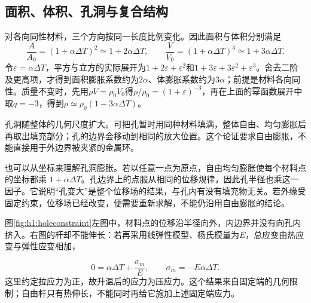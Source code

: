 \subsection{面积、体积、孔洞与复合结构}
对各向同性材料，三个方向按同一长度比例变化。因此面积与体积分别满足
\[\frac A{A_0}=(1+\alpha\Delta T)^2\simeq1+2\alpha\Delta T,\qquad
\frac V{V_0}=(1+\alpha\Delta T)^3\simeq1+3\alpha\Delta T.\]
令$\varepsilon=\alpha\Delta T$，平方与立方的实际展开为$1+2\varepsilon+\varepsilon^2$和$1+3\varepsilon+3\varepsilon^2+\varepsilon^3$。舍去二阶及更高项，才得到面积膨胀系数约为$2\alpha$、体膨胀系数约为$3\alpha$；前提是材料各向同性。质量不变时，先用$\rho V=\rho_0V_0$得$\rho/\rho_0=(1+\varepsilon)^{-3}$，再在上面的幂函数展开中取$q=-3$，得到$\rho\simeq\rho_0(1-3\alpha\Delta T)$。

孔洞随整体的几何尺度扩大。可把孔暂时用同种材料填满，整体自由、均匀膨胀后再取出填充部分；孔的边界会移动到相同的放大位置。这个论证要求自由膨胀，不能直接用于外边界被夹紧的金属环。

也可以从坐标来理解孔洞膨胀。若以任意一点为原点，自由均匀膨胀使每个材料点的坐标都乘 $1+\alpha\Delta T$。孔边界上的点服从相同的位移规律，因此孔半径也乘这一因子。它说明“孔变大”是整个位移场的结果，与孔内有没有填充物无关。若外缘受固定约束，位移场已经改变，便需要重新求解，不能仍沿用自由膨胀的结论。

图\ref{fig:h1:holeconstraint}左图中，材料点的位移沿半径向外，内边界并没有向孔内挤入。右图的杆却不能伸长：若再采用线弹性模型、杨氏模量为$E$，总应变由热应变与弹性应变相加，

\[
 0=\alpha\Delta T+\frac{\sigma_m}{E},\qquad
 \sigma_m=-E\alpha\Delta T.
\]
这里约定拉应力为正，故升温后的应力为压应力。这个结果来自固定端的几何限制；自由杆只有热伸长，不能同时再给它施加上述固定端应力。




